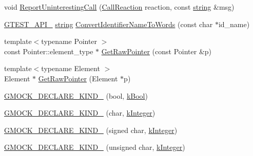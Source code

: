 \begin{DoxyCompactItemize}
\item 
void \hyperlink{namespacetesting_1_1internal_a8d99a1e87d0cea563b2bfad8a4e65276}{Report\+Uninteresting\+Call} (\hyperlink{namespacetesting_1_1internal_adfcd859062983a889f4bd18e6977357e}{Call\+Reaction} reaction, const \hyperlink{namespacetesting_1_1internal_a8e8ff5b11e64078831112677156cb111}{string} \&msg)
\item 
\hyperlink{gtest-port_8h_aa73be6f0ba4a7456180a94904ce17790}{G\+T\+E\+S\+T\+\_\+\+A\+P\+I\+\_\+} \hyperlink{namespacetesting_1_1internal_a8e8ff5b11e64078831112677156cb111}{string} \hyperlink{namespacetesting_1_1internal_a571db854f6de337007c53573c9cbf8a3}{Convert\+Identifier\+Name\+To\+Words} (const char $\ast$id\+\_\+name)
\item 
{\footnotesize template$<$typename Pointer $>$ }\\const Pointer\+::element\+\_\+type $\ast$ \hyperlink{namespacetesting_1_1internal_ae88d1a6f95165c43c27a6c0e2d357e61}{Get\+Raw\+Pointer} (const Pointer \&p)
\item 
{\footnotesize template$<$typename Element $>$ }\\Element $\ast$ \hyperlink{namespacetesting_1_1internal_a4d17b114b61b805ac5f37e9c26e29e55}{Get\+Raw\+Pointer} (Element $\ast$p)
\item 
\hyperlink{namespacetesting_1_1internal_a20f5584732e44a368e7acf295b639319}{G\+M\+O\+C\+K\+\_\+\+D\+E\+C\+L\+A\+R\+E\+\_\+\+K\+I\+N\+D\+\_\+} (bool, \hyperlink{namespacetesting_1_1internal_aa8747bda20137c9aa7f846dee830e686a3af2191917fb1796599139b3615302fe}{k\+Bool})
\item 
\hyperlink{namespacetesting_1_1internal_ac8f3722ca21d8b14f86e5c949e843508}{G\+M\+O\+C\+K\+\_\+\+D\+E\+C\+L\+A\+R\+E\+\_\+\+K\+I\+N\+D\+\_\+} (char, \hyperlink{namespacetesting_1_1internal_aa8747bda20137c9aa7f846dee830e686a8a52f0fd73e05da35c45d80653633cab}{k\+Integer})
\item 
\hyperlink{namespacetesting_1_1internal_ae5b8e77d245fd0838ab22e439e92e9af}{G\+M\+O\+C\+K\+\_\+\+D\+E\+C\+L\+A\+R\+E\+\_\+\+K\+I\+N\+D\+\_\+} (signed char, \hyperlink{namespacetesting_1_1internal_aa8747bda20137c9aa7f846dee830e686a8a52f0fd73e05da35c45d80653633cab}{k\+Integer})
\item 
\hyperlink{namespacetesting_1_1internal_ab13e89be2f0f22b1da9e22cd53bce5ce}{G\+M\+O\+C\+K\+\_\+\+D\+E\+C\+L\+A\+R\+E\+\_\+\+K\+I\+N\+D\+\_\+} (unsigned char, \hyperlink{namespacetesting_1_1internal_aa8747bda20137c9aa7f846dee830e686a8a52f0fd73e05da35c45d80653633cab}{k\+Integer})
\item 

\end{DoxyCompactItemize}
